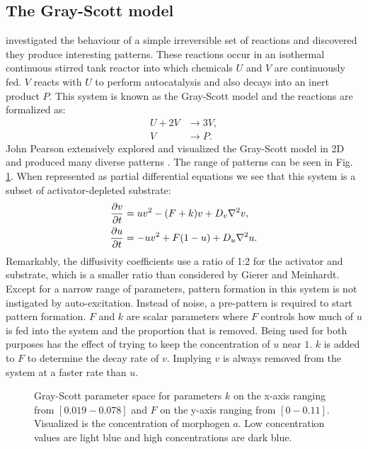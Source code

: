 \subsection{The Gray-Scott model}
\citet{gray1984} investigated the behaviour of a simple irreversible set of reactions and discovered they produce interesting patterns. These reactions occur in an isothermal continuous stirred tank reactor into which chemicals $U$ and $V$ are continuously fed. $V$ reacts with $U$ to perform autocatalysis and also decays into an inert product $P$. This system is known as the Gray-Scott model and the reactions are formalized as:
	\begin{equation}
	\begin{aligned}
	U + 2V &\to 3V, \\
	V &\to P.
	\end{aligned}
	\end{equation}
John Pearson extensively explored and visualized the Gray-Scott model in 2D and produced many diverse patterns \citep{pearson1993}. The range of patterns can be seen in Fig. \ref{fig:grayscottParameterMap}. When represented as partial differential equations we see that this system is a subset of activator-depleted substrate:
	\begin{equation}
	\begin{aligned} \label{eq:grayscottRD}
	\frac{\partial v}{\partial t} &= uv^2 - (F+k)v + D_v \nabla^2 v,\\
	\frac{\partial u}{\partial t} &= -uv^2 + F(1-u) + D_u \nabla^2 u.
	\end{aligned}
	\end{equation}
Remarkably, the diffusivity coefficients use a ratio of 1:2 for the activator and substrate, which is a smaller ratio than considered by Gierer and Meinhardt. Except for a narrow range of parameters, pattern formation in this system is not instigated by auto-excitation. Instead of noise, a pre-pattern is required to start pattern formation. $F$ and $k$ are scalar parameters where $F$ controls how much of $u$ is fed into the system and the proportion that is removed. Being used for both purposes has the effect of trying to keep the concentration of $u$ near $1$. $k$ is added to $F$ to determine the decay rate of $v$. Implying $v$ is always removed from the system at a faster rate than $u$.

\begin{figure}[H]
	\centering
	\caption{Gray-Scott parameter space for parameters $k$ on the x-axis ranging from $[0.019 - 0.078]$ and $F$ on the y-axis ranging from $[0 - 0.11]$. Visualized is the concentration of morphogen $a$. Low concentration values are light blue and high concentrations are dark blue.}
	\label{fig:grayscottParameterMap}
\end{figure}

